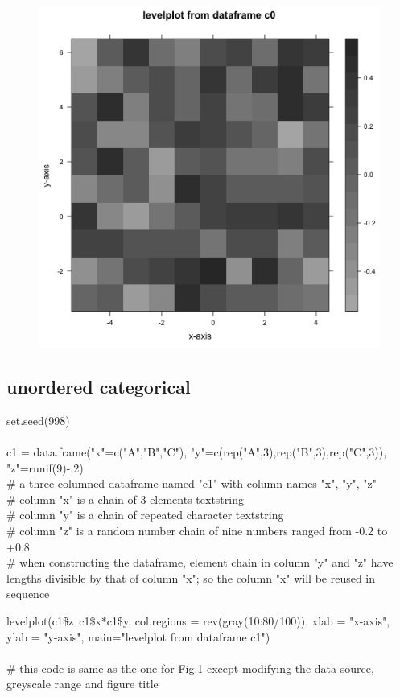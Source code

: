 \documentclass[../note.tex]{subfiles} %
\begin{document}
\begin{figure}[H]
    \centering
    \includegraphics[width=.5\linewidth]{graph/lvPlt1.png}
    \label{g:lv1}
\end{figure}

\subsection{unordered categorical}
\begin{code}
set.seed(998)\\\\
c1 = data.frame("x"=c("A","B","C"), "y"=c(rep("A",3),rep("B",3),rep("C",3)), "z"=runif(9)-.2)\\
\# a three-columned dataframe named "c1" with column names "x", "y", "z"\\
\# column "x" is a chain of 3-elements textstring\\
\# column "y" is a chain of repeated character textstring\\
\# column "z" is a random number chain of nine numbers ranged from -0.2 to +0.8\\
\# when constructing the dataframe, element chain in column "y" and "z" have lengths divisible by that of column "x"; so the column "x" will be reused in sequence
\end{code}

\begin{code}
levelplot(c1\$z~c1\$x*c1\$y, col.regions = rev(gray(10:80/100)), xlab = "x-axis", ylab = "y-axis", main="levelplot from dataframe c1")\\\\
\# this code is same as the one for Fig.\ref{g:lv1} except modifying the data source, greyscale range and figure title
\end{code}
\end{document}
